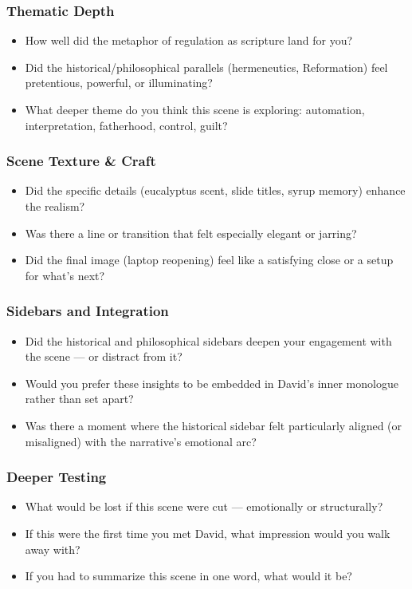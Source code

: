 \subsubsection*{Thematic Depth}

\begin{itemize}
  \item How well did the metaphor of regulation as scripture land for you?
  \item Did the historical/philosophical parallels (hermeneutics, Reformation) feel pretentious, powerful, or illuminating?
  \item What deeper theme do you think this scene is exploring: automation, interpretation, fatherhood, control, guilt?
\end{itemize}

\subsubsection*{Scene Texture \& Craft}

\begin{itemize}
  \item Did the specific details (eucalyptus scent, slide titles, syrup memory) enhance the realism?
  \item Was there a line or transition that felt especially elegant or jarring?
  \item Did the final image (laptop reopening) feel like a satisfying close or a setup for what’s next?
\end{itemize}

\subsubsection*{Sidebars and Integration}

\begin{itemize}
  \item Did the historical and philosophical sidebars deepen your engagement with the scene — or distract from it?
  \item Would you prefer these insights to be embedded in David’s inner monologue rather than set apart?
  \item Was there a moment where the historical sidebar felt particularly aligned (or misaligned) with the narrative’s emotional arc?
\end{itemize}

\subsubsection*{Deeper Testing}

\begin{itemize}
  \item What would be lost if this scene were cut — emotionally or structurally?
  \item If this were the first time you met David, what impression would you walk away with?
  \item If you had to summarize this scene in one word, what would it be?
\end{itemize}